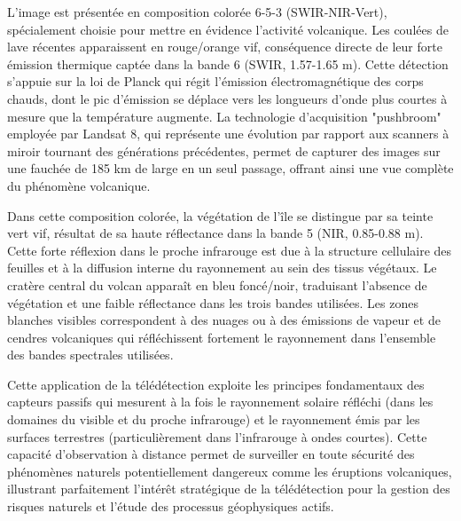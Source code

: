 \documentclass[12pt,a4paper]{article}
\begin{document}
L'image est présentée en composition colorée 6-5-3 (SWIR-NIR-Vert), spécialement choisie pour mettre en évidence l'activité volcanique. Les coulées de lave récentes apparaissent en rouge/orange vif, conséquence directe de leur forte émission thermique captée dans la bande 6 (SWIR, 1.57-1.65 \textmu m). Cette détection s'appuie sur la loi de Planck qui régit l'émission électromagnétique des corps chauds, dont le pic d'émission se déplace vers les longueurs d'onde plus courtes à mesure que la température augmente. La technologie d'acquisition "pushbroom" employée par Landsat 8, qui représente une évolution par rapport aux scanners à miroir tournant des générations précédentes, permet de capturer des images sur une fauchée de 185 km de large en un seul passage, offrant ainsi une vue complète du phénomène volcanique.

Dans cette composition colorée, la végétation de l'île se distingue par sa teinte vert vif, résultat de sa haute réflectance dans la bande 5 (NIR, 0.85-0.88 \textmu m). Cette forte réflexion dans le proche infrarouge est due à la structure cellulaire des feuilles et à la diffusion interne du rayonnement au sein des tissus végétaux. Le cratère central du volcan apparaît en bleu foncé/noir, traduisant l'absence de végétation et une faible réflectance dans les trois bandes utilisées. Les zones blanches visibles correspondent à des nuages ou à des émissions de vapeur et de cendres volcaniques qui réfléchissent fortement le rayonnement dans l'ensemble des bandes spectrales utilisées.

Cette application de la télédétection exploite les principes fondamentaux des capteurs passifs qui mesurent à la fois le rayonnement solaire réfléchi (dans les domaines du visible et du proche infrarouge) et le rayonnement émis par les surfaces terrestres (particulièrement dans l'infrarouge à ondes courtes). Cette capacité d'observation à distance permet de surveiller en toute sécurité des phénomènes naturels potentiellement dangereux comme les éruptions volcaniques, illustrant parfaitement l'intérêt stratégique de la télédétection pour la gestion des risques naturels et l'étude des processus géophysiques actifs.
\end{document}
